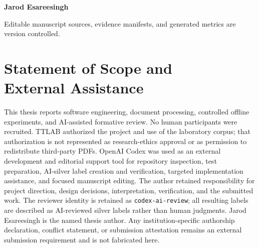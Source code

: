 \documentclass[12pt,oneside,openany]{book}
\begin{document}
\frontmatter
\hypersetup{pageanchor=false}
\begin{titlepage}
  \centering
  \vspace*{18mm}
  {\Large\bfseries\color{Navy} \universityname\par}
  \vspace{8mm}
  {\large \facultyname\par}
  \vfill
  {\Huge\bfseries\color{Navy} \thesistitle\par}
  \vspace{6mm}
  {\Large\color{Slate} \thesissubtitle\par}
  \vfill
  {\Large\bfseries \projectcontext\par}
  \vspace{12mm}
  {\large\textbf{Jarod Esareesingh}\par}
  \vspace{3mm}
  {\large\href{mailto:\studentemail}{\studentemail}\par}
  \vspace{3mm}
  {\large\studentcountry\par}
  \vfill
  {\small Editable manuscript sources, evidence manifests, and generated metrics are version controlled.\par}
\end{titlepage}
\hypersetup{pageanchor=true}



\chapter*{Statement of Scope and\\External Assistance}
This thesis reports software engineering, document processing, controlled offline experiments, and AI-assisted formative review. No human participants were recruited. TTLAB authorized the project and use of the laboratory corpus; that authorization is not represented as research-ethics approval or as permission to redistribute third-party PDFs. OpenAI Codex was used as an external development and editorial support tool for repository inspection, test preparation, AI-silver label creation and verification, targeted implementation assistance, and focused manuscript editing. The author retained responsibility for project direction, design decisions, interpretation, verification, and the submitted work. The reviewer identity is retained as \texttt{codex-ai-review}; all resulting labels are described as AI-reviewed silver labels rather than human judgments. Jarod Esareesingh is the named thesis author. Any institution-specific authorship declaration, conflict statement, or submission attestation remains an external submission requirement and is not fabricated here.
\end{document}
